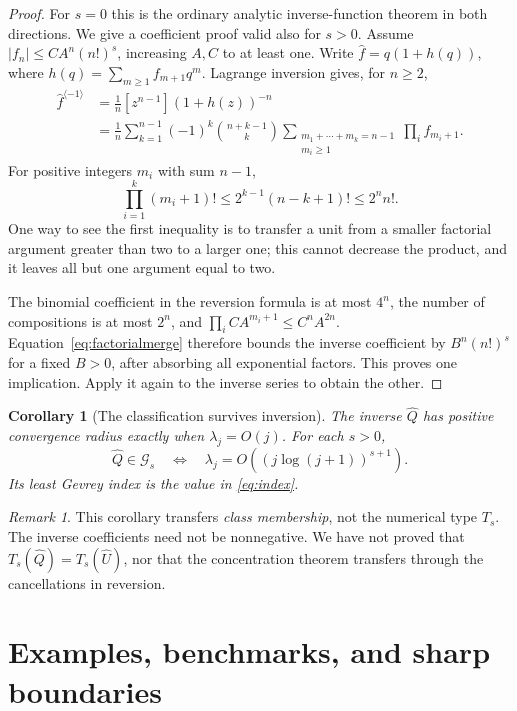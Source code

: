 \documentclass[11pt,a4paper]{article}
\numberwithin{equation}{section}
\newtheorem{corollary}[theorem]{Corollary}
\theoremstyle{definition}
\theoremstyle{remark}
\newtheorem{remark}[theorem]{Remark}
\newcommand{\Gev}{\mathcal G}
\newcommand{\Uhat}{\widehat U}
\newcommand{\Qhat}{\widehat Q}
\begin{document}
\begin{proof}
For $s=0$ this is the ordinary analytic inverse-function theorem in both
directions.  We give a coefficient proof valid also for $s>0$.
Assume $|f_n|\le CA^n(n!)^s$, increasing $A,C$ to at least one.
Write $\widehat f=q(1+h(q))$, where
$h(q)=\sum_{m\ge1}f_{m+1}q^m$.  Lagrange inversion gives, for $n\ge2$,
\begin{align*}
 [q^n]\widehat f^{\langle-1\rangle}
 &=\frac1n[z^{n-1}](1+h(z))^{-n}\\
 &=\frac1n\sum_{k=1}^{n-1}(-1)^k\binom{n+k-1}{k}
       \sum_{\substack{m_1+\cdots+m_k=n-1\\m_i\ge1}}
            \prod_i f_{m_i+1}.
\end{align*}
For positive integers $m_i$ with sum $n-1$,
\begin{equation}
 \prod_{i=1}^k(m_i+1)!
 \le2^{k-1}(n-k+1)!\le2^n n!.
 \label{eq:factorialmerge}
\end{equation}
One way to see the first inequality is to transfer a unit from a smaller
factorial argument greater than two to a larger one; this cannot decrease
the product, and it leaves all but one argument equal to two.

The binomial coefficient in the reversion formula is at most $4^n$,
the number of compositions is at most $2^n$, and
$\prod_i CA^{m_i+1}\le C^nA^{2n}$.  Equation~\eqref{eq:factorialmerge}
therefore bounds the inverse coefficient by
$B^n(n!)^s$ for a fixed $B>0$, after absorbing all exponential factors.
This proves one implication.  Apply it again to the inverse series to
obtain the other.
\end{proof}

\begin{corollary}[The classification survives inversion]
\label{cor:inverse}
The inverse $\Qhat$ has positive convergence radius exactly when
$\lambda_j=O(j)$.  For each $s>0$,
\[
 \Qhat\in\Gev_s
 \quad\Longleftrightarrow\quad
 \lambda_j=O((j\log(j+1))^{s+1}).
\]
Its least Gevrey index is the value in \eqref{eq:index}.
\end{corollary}

\begin{remark}
This corollary transfers \emph{class membership}, not the numerical type
$T_s$.  The inverse coefficients need not be nonnegative.  We have not
proved that $T_s(\Qhat)=T_s(\Uhat)$, nor that the concentration theorem
transfers through the cancellations in reversion.
\end{remark}

\section{Examples, benchmarks, and sharp boundaries}
\label{sec:examples}
\end{document}
